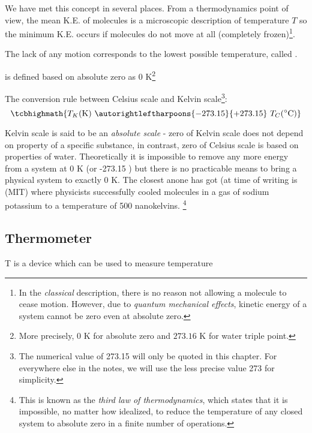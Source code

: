 We have met this concept in several places. From a thermodynamics point of view, the mean K.E. of molecules is a microscopic description of temperature $T$ so the minimum K.E. occurs if molecules do not move at all (completely frozen)\footnote{In the \emph{classical} description, there is no reason not allowing a molecule to cease motion. However, due to \emph{quantum mechanical effects}, kinetic energy of a system cannot be zero even at absolute zero.}.

The lack of any motion corresponds to the lowest possible temperature, called .

 is defined based on absolute zero as 0 K\footnote{More precisely, 0 K for absolute zero  and $273.16\text{ K}$ for water triple point.}

\cmt The conversion rule between Celsius scale and Kelvin scale\footnote{The numerical value of 273.15 will only be quoted in this chapter. For everywhere else in the notes, we will use the less precise value 273 for simplicity.}: $$\tcbhighmath{T_K (\text{K}) \text{ } \autorightleftharpoons{\footnotesize -273.15}{\footnotesize +273.15} \text{ } T_C (\OC)}$$

\cmt Kelvin scale is said to be an \emph{absolute scale} - zero of Kelvin scale does not depend on property of a specific substance, in contrast, zero of Celsius scale is based on properties of water. Theoretically it is impossible to remove any more energy from a system at 0 K (or -273.15 \OC) but there is no practicable means to bring a physical system to exactly $0\text{ K}$. The closest anone has got (at time of writing is (MIT) where physicists successfully cooled molecules in a gas of sodium potassium to a temperature of 500 nanokelvins. 
\footnote{This is known as the \emph{third law of thermodynamics}, which states that it is impossible, no matter how idealized, to reduce the temperature of any closed system to absolute zero in a finite number of operations.}




\subsection{Thermometer}

T  is a device which can be used to measure temperature



